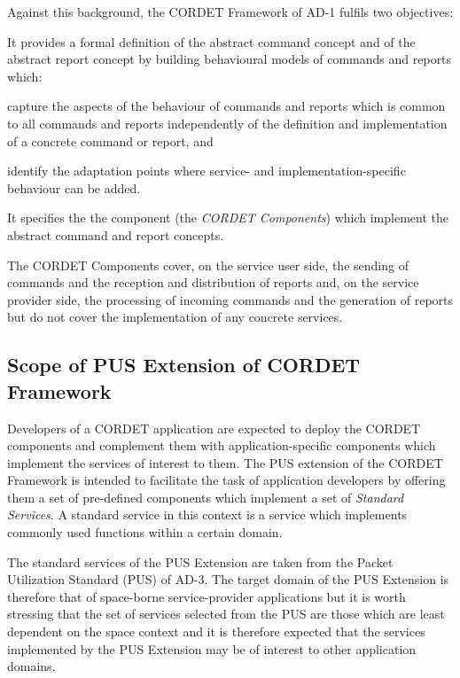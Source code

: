 \documentclass[a4paper,10pt]{article}
\newenvironment{fw_itemize}						%
{\begin{itemize}
  \setlength{\itemsep}{1mm}
  \setlength{\parskip}{0pt}
  \setlength{\parsep}{0pt}}
{\end{itemize}}
\begin{document}
Against this background, the CORDET Framework of AD-1 fulfils two objectives:

\begin{fw_itemize}
\item{} It provides a formal definition of the abstract command concept and of the abstract report concept by building behavioural models of commands and reports which:
	\begin{fw_itemize}
	\item capture the aspects of the behaviour of commands and reports which is common to all commands and reports independently of the definition and implementation of a concrete command or report, and
	\item identify the adaptation points where service- and implementation-specific behaviour can be added.
	\end{fw_itemize}
\item{} It specifies the the component (the \textit{CORDET Components}) which implement the abstract command and report concepts.
\end{fw_itemize}

The CORDET Components cover, on the service user side, the sending of commands and the reception and distribution of reports and, on the service provider side, the processing of incoming commands and the generation of reports but do not cover the implementation of any concrete services. 

\subsection{Scope of PUS Extension of CORDET Framework}\label{sec:ScopePusExt}
Developers of a CORDET application are expected to deploy the CORDET components and complement them with application-specific components which implement the services of interest to them. The PUS extension of the CORDET Framework is intended to facilitate the task of application developers by offering them a set of pre-defined components which implement a set of \textit{Standard Services}. A standard service in this context is a service which implements commonly used functions within a certain domain. 

The standard services of the PUS Extension are taken from the Packet Utilization Standard (PUS) of AD-3. The target domain of the PUS Extension is therefore that of space-borne service-provider applications but it is worth stressing that the set of services selected from the PUS are those which are least dependent on the space context and it is therefore expected that the services implemented by the PUS Extension may be of interest to other application domains.
\end{document}
